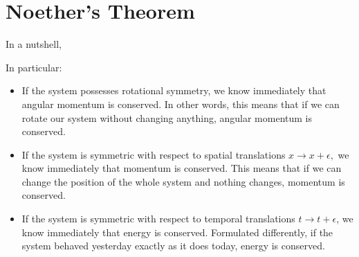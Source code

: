\section{Noether's Theorem}
In a nutshell, \textbf{}

In particular:
\begin{qt}
    \begin{itemize}
        \item If the system possesses rotational symmetry, we know immediately that angular momentum is conserved. In other words, this means that if we can rotate our system without changing anything, angular momentum is conserved.
        \item If the system is symmetric with respect to spatial translations
$x \rightarrow x+\epsilon,$ we know immediately that momentum is conserved. This means that if we can change the position of the whole system and nothing changes, momentum is conserved.
    \item If the system is symmetric with respect to temporal translations $t\rightarrow t+\epsilon$, we know immediately that energy is conserved. Formulated differently, if the system behaved yesterday exactly as it does today, energy is conserved.
    \end{itemize}
\end{qt}

